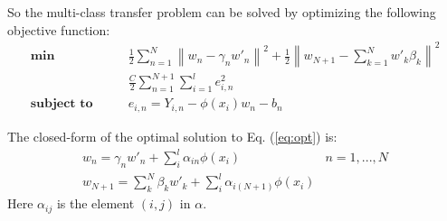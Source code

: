 So the multi-class transfer problem can be solved by optimizing the following objective function:
\begin{equation}\label{eq:opt}
\begin{aligned}
\textbf{min}\qquad {} & \frac{1}{2}\sum\limits_{n = 1}^N {{{\left\| {{w_n} - {\gamma _n}{{w'}_n}} \right\|}^2}}  + \frac{1}{2}{\left\| {{w_{N + 1}} - \sum\limits_{k = 1}^N {w{'_k}{\beta _k}} } \right\|^2}\\& \frac{C}{2}\sum\limits_{n = 1}^{N + 1} {\sum\limits_{i = 1}^l {e_{i,n}^2} }  \\
\textbf{subject to}\qquad {} &{e_{i,n}} = {Y_{i,n}} - \phi ({x_i}){w_n} - {b_n}
\end{aligned}
\end{equation}

The closed-form of the optimal solution to  Eq. (\ref{eq:opt}) is:
\begin{equation*}
\begin{array}{*{20}{c}}
{{w_n} = {\gamma _n}{{w'}_n} + \sum\limits_i^l {{\alpha _{in}}{\phi(x_i)}} }&{n = 1,...,N}\\
{{w_{N + 1}} = \sum\limits_k^N {{\beta _k}{{w'}_k}}  + \sum\limits_i^l {{\alpha _{i(N + 1)}}{\phi(x_i)}} }&{}
\end{array}
\end{equation*}
Here $\alpha_{ij}$ is the element $(i,j)$ in $\alpha$.

